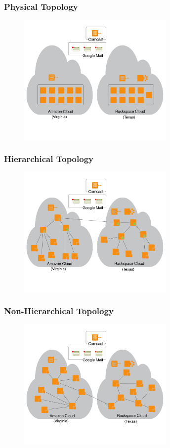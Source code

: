\documentclass[t,handout]{beamer}
\begin{document}
\begin{frame}
\frametitle{Physical Topology}
\begin{figure}[!t]
\centering
\includegraphics[width=3in]{physical-clouds}
\end{figure}
\end{frame}

\begin{frame}
\frametitle{Hierarchical Topology}
\begin{figure}[!t]
\centering
\includegraphics[width=3in]{hierarchical-clouds}
\end{figure}
\end{frame}

\begin{frame}
\frametitle{Non-Hierarchical Topology}
\begin{figure}[!t]
\centering
\includegraphics[width=3in]{non-hierarchical-clouds}
\end{figure}
\end{frame}
\end{document}
